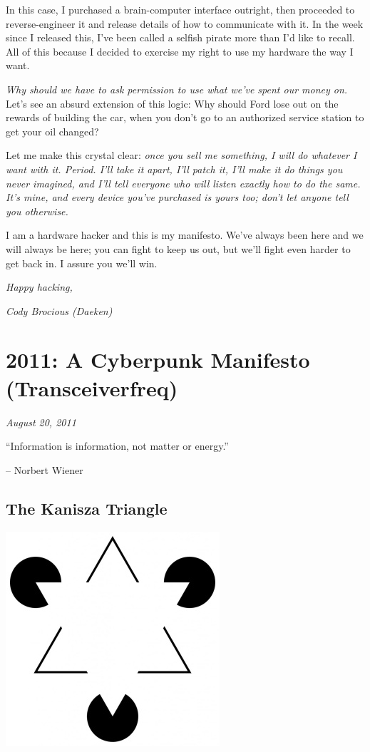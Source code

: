 \documentclass[letterpaper,12pt,english]{sphinxmanual}
\begin{document}
In this case, I purchased a brain-computer interface outright, then proceeded to reverse-engineer it and release details of how to communicate with it. In the week since I released this, I've been called a selfish pirate more than I'd like to recall. All of this because I decided to exercise my right to use my hardware the way I want.

\emph{Why should we have to ask permission to use what we've spent our money on.} Let's see an absurd extension of this logic: Why should Ford lose out on the rewards of building the car, when you don't go to an authorized service station to get your oil changed?

Let me make this crystal clear: \emph{once you sell me something, I will do whatever I want with it. Period. I'll take it apart, I'll patch it, I'll make it do things you never imagined, and I'll tell everyone who will listen exactly how to do the same. It's mine, and every device you've purchased is yours too; don't let anyone tell you otherwise.}

I am a hardware hacker and this is my manifesto. We've always been here and we will always be here; you can fight to keep us out, but we'll fight even harder to get back in. I assure you we'll win.

\emph{Happy hacking,}

\emph{Cody Brocious (Daeken)}


\chapter{2011: A Cyberpunk Manifesto (Transceiverfreq)}
\label{2011:a-cyberpunk-manifesto-transceiverfreq}\label{2011::doc}
\emph{August 20, 2011}

``Information is information, not matter or energy.''

-- Norbert Wiener


\section{The Kanisza Triangle}
\label{2011:the-kanisza-triangle}
\includegraphics{kanizsa.jpg}
\end{document}
